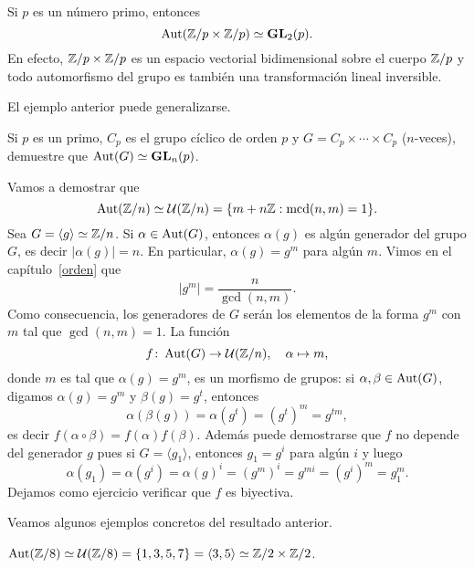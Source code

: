 \begin{example}
Si $p$ es un número primo, entonces
\[
\operatorname{Aut}(\mathbb{Z}/p\times\mathbb{Z}/p)\simeq\mathbf{GL}_2(p).
\] 
En efecto, $\mathbb{Z}/p\times\mathbb{Z}/p$ es un espacio vectorial bidimensional sobre el cuerpo $\mathbb{Z}/p$ y
todo automorfismo del grupo es también una transformación lineal inversible.    
\end{example}

El ejemplo anterior puede generalizarse. 

\begin{exercise}
Si $p$ es un primo, $C_p$ es el grupo cíclico de orden $p$ y $G=C_p\times\cdots\times C_p$ ($n$-veces), demuestre que
$\operatorname{Aut}(G)\simeq\mathbf{GL}_n(p)$.
\end{exercise}

\begin{example}
Vamos a demostrar que 
\[
\operatorname{Aut}(\mathbb{Z}/n)\simeq\mathcal{U}(\mathbb{Z}/n)=\{m+n\mathbb{Z}:\operatorname{mcd}(n,m)=1\}.
\]
Sea $G=\langle g\rangle\simeq\mathbb{Z}/n$. Si $\alpha\in\operatorname{Aut}(G)$, entonces $\alpha(g)$ es algún generador del grupo $G$, es decir $|\alpha(g)|=n$. En particular, $\alpha(g)=g^m$ para algún $m$. Vimos en el capítulo~\ref{orden} que 
\[
|g^m|=\frac{n}{\gcd(n,m)}.
\]
Como consecuencia, los generadores de $G$ serán los elementos de la forma $g^m$ con $m$ tal que $\gcd(n,m)=1$. La función
\[
f\colon \operatorname{Aut}(G)\to\mathcal{U}(\mathbb{Z}/n),\quad
\alpha\mapsto m,
\]
donde $m$ es tal que $\alpha(g)=g^m$, es un morfismo de grupos: si $\alpha,\beta\in\operatorname{Aut}(G)$, digamos $\alpha(g)=g^m$ y $\beta(g)=g^t$, entonces 
\[
\alpha(\beta(g))=\alpha(g^t)=(g^t)^m=g^{tm},
\]
es decir $f(\alpha\circ\beta)=f(\alpha)f(\beta)$. Además puede demostrarse que $f$ no depende del generador $g$ pues si $G=\langle g_1\rangle$, entonces $g_1=g^i$ para algún $i$ y luego 
\[
\alpha(g_1)=\alpha(g^i)=\alpha(g)^i=(g^m)^i=g^{mi}=(g^i)^m=g_1^m.
\] 
Dejamos como ejercicio verificar que $f$ es biyectiva. 
\end{example}

Veamos algunos ejemplos concretos del resultado anterior. 

\begin{example}
$\operatorname{Aut}(\mathbb{Z}/8)\simeq\mathcal{U}(\mathbb{Z}/8)=\{1,3,5,7\}=\langle 3,5\rangle\simeq\mathbb{Z}/2\times\mathbb{Z}/2$.
\end{example}

